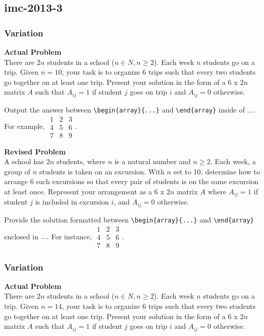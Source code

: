 \subsection{imc-2013-3}
\subsubsection{Variation}
\textbf{Actual Problem}\\
There are $2n$ students in a school ($n \in N, n \geq 2$). Each week $n$ students go on a trip.
Given $n = 10$, your task is to organize 6 trips such that every two students go together on at least one trip. Present your solution 
in the form of a 6 x $2n$ matrix $A$ such that $A_{ij} = 1$ if student $j$ goes on trip $i$ and $A_{ij} = 0$ otherwise.

Output the answer between \verb|\begin{array}{...}| and \verb|\end{array}| inside of $\boxed{...}$. For example, $\boxed{\begin{array}{ccc}1 & 2 & 3 \\ 4 & 5 & 6 \\ 7 & 8 & 9\end{array}}$.

\textbf{Revised Problem}\\
A school has $2n$ students, where $n$ is a natural number and $n \geq 2$. Each week, a group of $n$ students is taken on an excursion. With $n$ set to 10, determine how to arrange 6 such excursions so that every pair of students is on the same excursion at least once. Represent your arrangement as a 6 x $2n$ matrix $A$ where $A_{ij} = 1$ if student $j$ is included in excursion $i$, and $A_{ij} = 0$ otherwise.

Provide the solution formatted between \verb|\begin{array}{...}| and \verb|\end{array}| enclosed in $\boxed{...}$. For instance, $\boxed{\begin{array}{ccc}1 & 2 & 3 \\ 4 & 5 & 6 \\ 7 & 8 & 9\end{array}}$.

\subsubsection{Variation}
\textbf{Actual Problem}\\
There are $2n$ students in a school ($n \in N, n \geq 2$). Each week $n$ students go on a trip.
Given $n = 14$, your task is to organize 6 trips such that every two students go together on at least one trip. Present your solution 
in the form of a 6 x $2n$ matrix $A$ such that $A_{ij} = 1$ if student $j$ goes on trip $i$ and $A_{ij} = 0$ otherwise.

